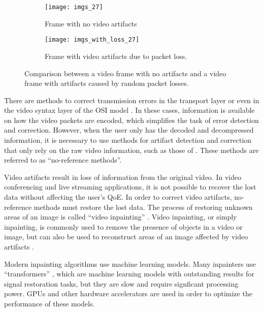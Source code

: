 \begin{figure} [!h]
  \centering
  
  \begin{subfigure}[t]{0.49\textwidth}
    \centering
    \texttt{[image: imgs\_27]}
    \caption{Frame with no video artifacts}
    \label{fig:frame_comparison.a}
  \end{subfigure}
  \hfill
  \begin{subfigure}[t]{0.49\textwidth}
    \centering
    \texttt{[image: imgs\_with\_loss\_27]}
    \caption{Frame with video artifacts due to packet loss.}
    \label{fig:frame_comparison.b}
  \end{subfigure}
  
  \caption{Comparison between a video frame with no artifacts and a video frame with artifacts caused by random packet losses.}
  \label{fig:frame_comparison}

\end{figure}

There are methods to correct transmission errors in the transport layer or even in the video syntax layer of the OSI model \cite{Sanyal2021}. In these cases, information is available on how the video packets are encoded, which simplifies the task of error detection and correction. However, when the user only has the decoded and decompressed information, it is necessary to use methods for artifact detection and correction that only rely on the raw video information, such as those of \cite{Vranjes2018, Sanyal2021,Goodall2019}. These methods are referred to as ``no-reference methods''.

Video artifacts result in loss of information from the original video. In video conferencing and live streaming applications, it is not possible to recover the lost data without affecting the user's QoE. In order to correct video artifacts, no-reference methods must restore the lost data. The process of restoring unknown areas of an image is called ``video inpainting'' \cite{Li2022, Zhou2021}. Video inpainting, or simply inpainting, is commonly used to remove the presence of objects in a video or image, but can also be used to reconstruct areas of an image affected by video artifacts \cite{Dong2023, Brenes2022}.

Modern inpainting algorithms use machine learning models. Many inpainters use ``transformers'' \cite{Li2022, Zhou2021, Liu2021}, which are machine learning models with outstanding results for signal restoration tasks, but they are slow and require signficant processing power. GPUs and other hardware accelerators are used in order to optimize the performance of these models.

